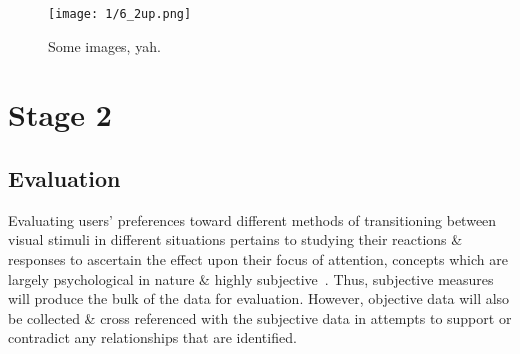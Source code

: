\clearpage

\begin{figure}[h]
	\begin{center}
	\texttt{[image: 1/6\_2up.png]}
	\caption{Some images, yah.}
	\end{center}
\end{figure}























\clearpage

\section{Stage 2}

\subsection{Evaluation}

Evaluating users' preferences toward different methods of transitioning between visual stimuli in different situations pertains to studying their reactions \& responses to ascertain the effect upon their focus of attention, concepts which are largely psychological in nature \& highly subjective~\cite{Ijsselsteijn2001}. Thus, subjective measures will produce the bulk of the data for evaluation. However, objective data will also be collected \& cross referenced with the subjective data in attempts to support or contradict any relationships that are identified.

